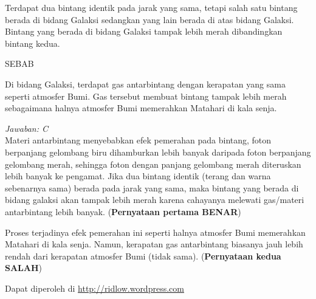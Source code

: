 \documentclass[11pt,fleqn, a4paper]{exam}
\begin{document}
\begin{questions}
\question Terdapat dua bintang identik pada jarak yang sama, tetapi salah satu bintang berada di bidang Galaksi sedangkan yang lain berada di atas bidang Galaksi. Bintang yang berada di bidang Galaksi tampak lebih merah dibandingkan bintang kedua. 
\begin{center}
SEBAB
\end{center}
\noindent Di bidang Galaksi, terdapat gas antarbintang dengan kerapatan yang sama seperti atmosfer Bumi. Gas tersebut membuat bintang tampak lebih merah sebagaimana halnya atmosfer Bumi memerahkan Matahari di kala senja.

\textit{Jawaban: C}\\
Materi antarbintang menyebabkan efek pemerahan pada bintang, foton berpanjang gelombang biru dihamburkan lebih banyak daripada foton berpanjang gelombang merah, sehingga foton dengan panjang gelombang merah diteruskan lebih banyak ke pengamat. Jika dua bintang identik (terang dan warna sebenarnya sama) berada pada jarak yang sama, maka bintang yang berada di bidang galaksi akan tampak lebih merah karena cahayanya melewati gas/materi antarbintang lebih banyak. (\textbf{Pernyataan pertama BENAR})


Proses terjadinya efek pemerahan ini seperti halnya atmosfer Bumi memerahkan Matahari di kala senja. Namun, kerapatan gas antarbintang biasanya jauh lebih rendah dari kerapatan atmosfer Bumi (tidak sama). (\textbf{Pernyataan kedua SALAH})

\end{questions}

\vspace{1cm}
\begin{flushright}
Dapat diperoleh di \href{http://ridlow.wordpress.com}{http://ridlow.wordpress.com}
\end{flushright}
\end{document}
